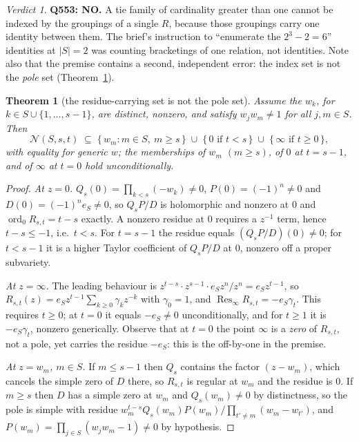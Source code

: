 \documentclass[11pt]{article}
\newtheorem{theorem}{Theorem}
\theoremstyle{definition}
\theoremstyle{remark}
\newtheorem*{verdict}{Verdict}
\DeclareMathOperator{\Res}{Res}
\begin{document}
\begin{verdict}
\textbf{Q553: NO.} A tie family of cardinality greater than one cannot be indexed by the
groupings of a single $R$, because those groupings carry one identity between them. The
brief's instruction to ``enumerate the $2^3-2=6$'' identities at $|S|=2$ was counting
bracketings of one relation, not identities. Note also that the premise contains a second,
independent error: the index set is not the \emph{pole} set (Theorem~\ref{thm:carrier}).
\end{verdict}

\begin{theorem}[the residue-carrying set is not the pole set]\label{thm:carrier}
Assume the $w_k$, for $k\in S\cup\{1,\dots,s-1\}$, are distinct, nonzero, and satisfy
$w_jw_m\neq1$ for all $j,m\in S$. Then
\[
  \mathcal{N}(S,s,t)\;\subseteq\;
  \{\,w_m: m\in S,\ m\ge s\,\}\;\cup\;\{\,0 \text{ if } t<s\,\}\;\cup\;\{\,\infty \text{ if } t\ge0\,\},
\]
with equality for generic $w$; the memberships of $w_m$ $(m\ge s)$, of $0$ at $t=s-1$,
and of $\infty$ at $t=0$ hold unconditionally.
\end{theorem}

\begin{proof}
\emph{At $z=0$.} $Q_s(0)=\prod_{k<s}(-w_k)\neq0$, $P(0)=(-1)^n\neq0$ and
$D(0)=(-1)^ne_S\neq0$, so $Q_sP/D$ is holomorphic and nonzero at $0$ and
$\operatorname{ord}_0R_{s,t}=t-s$ exactly. A nonzero residue at $0$ requires a $z^{-1}$
term, hence $t-s\le-1$, i.e.\ $t<s$. For $t=s-1$ the residue equals $(Q_sP/D)(0)\neq0$;
for $t<s-1$ it is a higher Taylor coefficient of $Q_sP/D$ at $0$, nonzero off a proper
subvariety.

\emph{At $z=\infty$.} The leading behaviour is
$z^{t-s}\cdot z^{s-1}\cdot e_Sz^{n}/z^{n}=e_Sz^{t-1}$, so
$R_{s,t}(z)=e_Sz^{t-1}\sum_{k\ge0}\gamma_kz^{-k}$ with $\gamma_0=1$, and
$\Res_\infty R_{s,t}=-e_S\gamma_t$. This requires $t\ge0$; at $t=0$ it equals
$-e_S\neq0$ unconditionally, and for $t\ge1$ it is $-e_S\gamma_t$, nonzero generically.
Observe that at $t=0$ the point $\infty$ is a \emph{zero} of $R_{s,t}$, not a pole,
yet carries the residue $-e_S$: this is the off-by-one in the premise.

\emph{At $z=w_m$, $m\in S$.} If $m\le s-1$ then $Q_s$ contains the factor $(z-w_m)$,
which cancels the simple zero of $D$ there, so $R_{s,t}$ is regular at $w_m$ and the
residue is $0$. If $m\ge s$ then $D$ has a simple zero at $w_m$ and $Q_s(w_m)\neq0$ by
distinctness, so the pole is simple with residue
$w_m^{t-s}Q_s(w_m)P(w_m)/\prod_{t'\neq m}(w_m-w_{t'})$, and
$P(w_m)=\prod_{j\in S}(w_jw_m-1)\neq0$ by hypothesis.
\end{proof}
\end{document}
